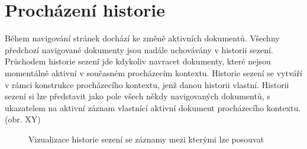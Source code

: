\section{Procházení historie}
\label{Chapter.Implementation.TraversingHistory}

Během navigování stránek dochází ke změně aktivních dokumentů. Všechny předchozí navigované dokumenty jsou nadále uchovávány v historii sezení. Průchodem historie sezení jde kdykoliv navracet dokumenty, které nejsou momentálně aktivní v současném procházecím kontextu. Historie sezení se vytváří v rámci konstrukce procházecího kontextu, jenž danou historii vlastní. Historii sezení si lze představit jako pole všech někdy navigovaných dokumentů, s ukazatelem na aktivní záznam vlastnící aktivní dokument procházecího kontextu. (obr. XY)

\begin{figure}[H]
  \begin{center}
    \caption{Vizualizace historie sezení se záznamy mezi kterými lze posouvat}
    \label{Figure.SessionHistory}
  \end{center}
\end{figure}

